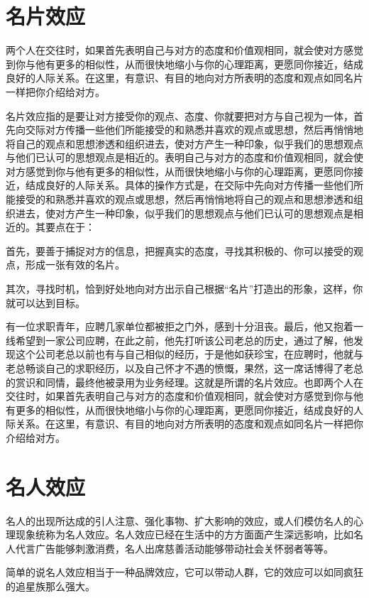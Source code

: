 \documentclass[11pt]{ctexart}
\begin{document}
\section{名片效应}
\label{sec-67}


两个人在交往时，如果首先表明自己与对方的态度和价值观相同，就会使对方感觉到你与他有更多的相似性，从而很快地缩小与你的心理距离，更愿同你接近，结成良好的人际关系。在这里，有意识、有目的地向对方所表明的态度和观点如同名片一样把你介绍给对方。

名片效应指的是要让对方接受你的观点、态度、你就要把对方与自己视为一体，首先向交际对方传播一些他们所能接受的和熟悉并喜欢的观点或思想，然后再悄悄地将自己的观点和思想渗透和组织进去，使对方产生一种印象，似乎我们的思想观点与他们已认可的思想观点是相近的。表明自己与对方的态度和价值观相同，就会使对方感觉到你与他有更多的相似性，从而很快地缩小与你的心理距离，更愿同你接近，结成良好的人际关系。具体的操作方式是，在交际中先向对方传播一些他们所能接受的和熟悉并喜欢的观点或思想，然后再悄悄地将自己的观点和思想渗透和组织进去，使对方产生一种印象，似乎我们的思想观点与他们已认可的思想观点是相近的。其要点在于：

首先，要善于捕捉对方的信息，把握真实的态度，寻找其积极的、你可以接受的观点，形成一张有效的名片。

其次，寻找时机，恰到好处地向对方出示自己根据“名片”打造出的形象，这样，你就可以达到目标。

有一位求职青年，应聘几家单位都被拒之门外，感到十分沮丧。最后，他又抱着一线希望到一家公司应聘，在此之前，他先打听该公司老总的历史，通过了解，他发现这个公司老总以前也有与自己相似的经历，于是他如获珍宝，在应聘时，他就与老总畅谈自己的求职经历，以及自己怀才不遇的愤慨，果然，这一席话博得了老总的赏识和同情，最终他被录用为业务经理。这就是所谓的名片效应。也即两个人在交往时，如果首先表明自己与对方的态度和价值观相同，就会使对方感觉到你与他有更多的相似性，从而很快地缩小与你的心理距离，更愿同你接近，结成良好的人际关系。在这里，有意识、有目的地向对方所表明的态度和观点如同名片一样把你介绍给对方。
\section{名人效应}
\label{sec-68}


名人的出现所达成的引人注意、强化事物、扩大影响的效应，或人们模仿名人的心理现象统称为名人效应。名人效应已经在生活中的方方面面产生深远影响，比如名人代言广告能够刺激消费，名人出席慈善活动能够带动社会关怀弱者等等。

简单的说名人效应相当于一种品牌效应，它可以带动人群，它的效应可以如同疯狂的追星族那么强大。
\end{document}
